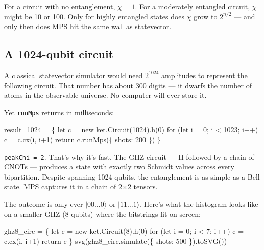 \documentclass[
  11pt,
  letterpaper,
  oneside]{scrbook}
\newenvironment{Shaded}{\begin{snugshade}}{\end{snugshade}}
\newcommand{\NormalTok}[1]{\textcolor[rgb]{0.00,0.23,0.31}{#1}}
\begin{document}
For a circuit with no entanglement, \(\chi = 1\). For a moderately
entangled circuit, \(\chi\) might be 10 or 100. Only for highly
entangled states does \(\chi\) grow to \(2^{n/2}\) --- and only then
does MPS hit the same wall as statevector.

\subsection{A 1024-qubit circuit}\label{a-1024-qubit-circuit}

A classical statevector simulator would need \(2^{1024}\) amplitudes to
represent the following circuit. That number has about 300 digits --- it
dwarfs the number of atoms in the observable universe. No computer will
ever store it.

Yet \texttt{runMps} returns in milliseconds:

\begin{Shaded}
\begin{Highlighting}[]
\NormalTok{result\_1024 = \{}
\NormalTok{  let c = new ket.Circuit(1024).h(0)}
\NormalTok{  for (let i = 0; i \textless{} 1023; i++) c = c.cx(i, i+1)}
\NormalTok{  return c.runMps(\{ shots: 200 \})}
\NormalTok{\}}
\end{Highlighting}
\end{Shaded}

\begin{Shaded}
\end{Shaded}

\texttt{peakChi\ =\ 2}. That's why it's fast. The GHZ circuit --- H
followed by a chain of CNOTs --- produces a state with exactly two
Schmidt values across every bipartition. Despite spanning 1024 qubits,
the entanglement is as simple as a Bell state. MPS captures it in a
chain of 2×2 tensors.

The outcome is only ever \(|00\ldots0\rangle\) or \(|11\ldots1\rangle\).
Here's what the histogram looks like on a smaller GHZ (8 qubits) where
the bitstrings fit on screen:

\begin{Shaded}
\begin{Highlighting}[]
\NormalTok{ghz8\_circ = \{}
\NormalTok{  let c = new ket.Circuit(8).h(0)}
\NormalTok{  for (let i = 0; i \textless{} 7; i++) c = c.cx(i, i+1)}
\NormalTok{  return c}
\NormalTok{\}}
\NormalTok{svg(ghz8\_circ.simulate(\{ shots: 500 \}).toSVG())}
\end{Highlighting}
\end{Shaded}
\end{document}
